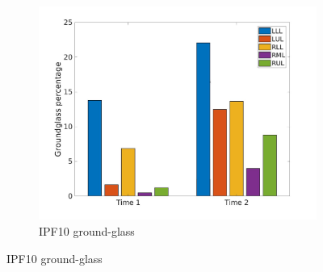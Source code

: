 \begin{figure}[H] 
\centering
\begin{subfigure}{.46\linewidth}%
  \includegraphics[width=\linewidth,trim={{.0\wd0} {.0\wd0} {.0\wd0} {.0\wd0}},clip]{Appendix/Image_AppexA/LobarDistribution/IPF10GroundglassLobarRegionDiseaseDistributionOverTime.jpg} %
  \caption{IPF10 ground-glass}
  \label{fig:IPF10LobarRegionDiseaseDistributionOverTime-a} 
\end{subfigure} 
\hspace{.3in}

\end{figure}
